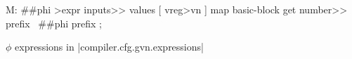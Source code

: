 \centering

  \begin{factorcode}
    M: ##phi >expr
        inputs>> values [ vreg>vn ] map
        basic-block get number>> prefix
        \ ##phi prefix ;
  \end{factorcode}

\caption{$\phi$ expressions in \factor|compiler.cfg.gvn.expressions|}
